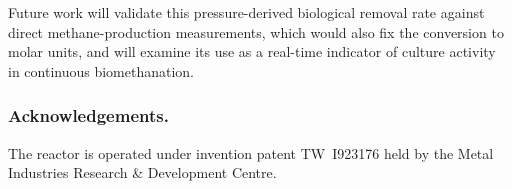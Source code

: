 \documentclass[sigconf]{acmart}
\begin{document}
Future work will validate this pressure-derived biological removal rate
against direct methane-production measurements, which would also fix
the conversion to molar units, and will examine its use as a real-time
indicator of culture activity in continuous biomethanation.

\subsubsection{Acknowledgements.} The reactor is operated under
invention patent TW~I923176 held by the Metal Industries Research \&
Development Centre.




\end{document}
